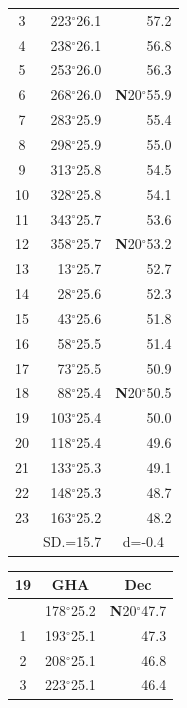 \documentclass[10pt, a4paper]{report}
\begin{document}
\begin{scriptsize}
\begin{tabular*}{0.2\textwidth}[t]{@{\extracolsep{\fill}}|c|rr|}
3 & 223$^\circ$26.1 & \raisebox{0.24ex}{\boldmath$\cdot$~\boldmath$\cdot$~~}57.2\\
4 & 238$^\circ$26.1 & 56.8\\
5 & 253$^\circ$26.0 & 56.3\\[2Pt]
6 & 268$^\circ$26.0 & \textbf{N}20$^\circ$55.9\\
7 & 283$^\circ$25.9 & 55.4\\
8 & 298$^\circ$25.9 & 55.0\\
9 & 313$^\circ$25.8 & \raisebox{0.24ex}{\boldmath$\cdot$~\boldmath$\cdot$~~}54.5\\
10 & 328$^\circ$25.8 & 54.1\\
11 & 343$^\circ$25.7 & 53.6\\[2Pt]
12 & 358$^\circ$25.7 & \textbf{N}20$^\circ$53.2\\
13 & 13$^\circ$25.7 & 52.7\\
14 & 28$^\circ$25.6 & 52.3\\
15 & 43$^\circ$25.6 & \raisebox{0.24ex}{\boldmath$\cdot$~\boldmath$\cdot$~~}51.8\\
16 & 58$^\circ$25.5 & 51.4\\
17 & 73$^\circ$25.5 & 50.9\\[2Pt]
18 & 88$^\circ$25.4 & \textbf{N}20$^\circ$50.5\\
19 & 103$^\circ$25.4 & 50.0\\
20 & 118$^\circ$25.4 & 49.6\\
21 & 133$^\circ$25.3 & \raisebox{0.24ex}{\boldmath$\cdot$~\boldmath$\cdot$~~}49.1\\
22 & 148$^\circ$25.3 & 48.7\\
23 & 163$^\circ$25.2 & 48.2\\
\hline
\rule{0pt}{2.4ex} & \multicolumn{1}{c}{SD.=15.7} & \multicolumn{1}{c|}{d=-0.4}\\
\hline
\end{tabular*}\noindent
\begin{tabular*}{0.2\textwidth}[t]{@{\extracolsep{\fill}}|c|rr|}
\hline
\multicolumn{1}{|c|}{\rule{0pt}{2.6ex}\textbf{19}} & \multicolumn{1}{c}{\textbf{GHA}} & \multicolumn{1}{c|}{\textbf{Dec}}\\
\hline\rule{0pt}{2.6ex}\noindent
0 & 178$^\circ$25.2 & \textbf{N}20$^\circ$47.7\\
1 & 193$^\circ$25.1 & 47.3\\
2 & 208$^\circ$25.1 & 46.8\\
3 & 223$^\circ$25.1 & \raisebox{0.24ex}{\boldmath$\cdot$~\boldmath$\cdot$~~}46.4\\

\end{tabular*}
\end{scriptsize}
\end{document}
